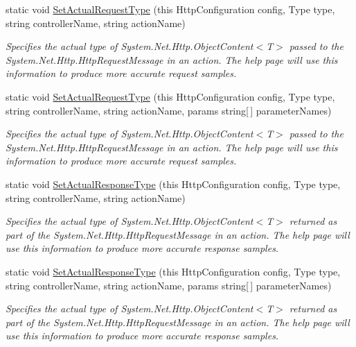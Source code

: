 \begin{DoxyCompactItemize}
static void \hyperlink{classApi3Layers_1_1Areas_1_1HelpPage_1_1HelpPageConfigurationExtensions_a977618c0c67efa9733ed109a3f730409}{Set\+Actual\+Request\+Type} (this Http\+Configuration config, Type type, string controller\+Name, string action\+Name)
\begin{DoxyCompactList}\small\item\em Specifies the actual type of System.\+Net.\+Http.\+Object\+Content$<$\+T$>$ passed to the System.\+Net.\+Http.\+Http\+Request\+Message in an action. The help page will use this information to produce more accurate request samples. \end{DoxyCompactList}\item 
static void \hyperlink{classApi3Layers_1_1Areas_1_1HelpPage_1_1HelpPageConfigurationExtensions_ab354c6439434e49c51e02a5a1d37f160}{Set\+Actual\+Request\+Type} (this Http\+Configuration config, Type type, string controller\+Name, string action\+Name, params string\mbox{[}$\,$\mbox{]} parameter\+Names)
\begin{DoxyCompactList}\small\item\em Specifies the actual type of System.\+Net.\+Http.\+Object\+Content$<$\+T$>$ passed to the System.\+Net.\+Http.\+Http\+Request\+Message in an action. The help page will use this information to produce more accurate request samples. \end{DoxyCompactList}\item 
static void \hyperlink{classApi3Layers_1_1Areas_1_1HelpPage_1_1HelpPageConfigurationExtensions_a7cb7f27af68b6ee4e745f021ec1b556a}{Set\+Actual\+Response\+Type} (this Http\+Configuration config, Type type, string controller\+Name, string action\+Name)
\begin{DoxyCompactList}\small\item\em Specifies the actual type of System.\+Net.\+Http.\+Object\+Content$<$\+T$>$ returned as part of the System.\+Net.\+Http.\+Http\+Request\+Message in an action. The help page will use this information to produce more accurate response samples. \end{DoxyCompactList}\item 
static void \hyperlink{classApi3Layers_1_1Areas_1_1HelpPage_1_1HelpPageConfigurationExtensions_adba814aa7b0c89363674b03b2f7e93ef}{Set\+Actual\+Response\+Type} (this Http\+Configuration config, Type type, string controller\+Name, string action\+Name, params string\mbox{[}$\,$\mbox{]} parameter\+Names)
\begin{DoxyCompactList}\small\item\em Specifies the actual type of System.\+Net.\+Http.\+Object\+Content$<$\+T$>$ returned as part of the System.\+Net.\+Http.\+Http\+Request\+Message in an action. The help page will use this information to produce more accurate response samples. \end{DoxyCompactList}\item 

\end{DoxyCompactItemize}
